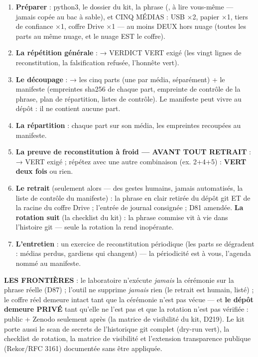 \begin{enumerate}
\item \textbf{Préparer} : python3, le dossier du kit, la phrase
(, à lire vous-même — jamais copée au bac
à sable), et CINQ MÉDIAS : USB ×2, papier ×1, tiers de confiance ×1,
coffre Drive ×1 — au moins DEUX hors nuage (toutes les parts au même
nuage, et le nuage EST le coffre).
\item \textbf{La répétition générale} :  → VERDICT VERT
exigé (les vingt lignes de reconstitution, la falsification refusée,
l'honnête vert).
\item \textbf{Le découpage} :  → les
cinq parts (une par média, séparément) + le manifeste (empreintes sha256
de chaque part, empreinte de contrôle de la phrase, plan de répartition,
listes de contrôle). Le manifeste peut vivre au dépôt : il ne contient
aucune part.
\item \textbf{La répartition} : chaque part sur son média, les empreintes
recoupées au manifeste.
\item \textbf{La preuve de reconstitution à froid — AVANT TOUT RETRAIT} :
 → VERT exigé ; répétez
avec une autre combinaison (ex. 2+4+5) : \textbf{VERT deux fois} ou rien.
\item \textbf{Le retrait} (seulement alors — des gestes humains, jamais
automatisés, la liste de contrôle du manifeste) : la phrase en clair
retirée du dépôt git ET de la racine du coffre Drive ; l'entrée de journal
consignée ; D81 amendée. \textbf{La rotation suit} (la checklist du kit) :
la phrase commise vit à vie dans l'histoire git — seule la rotation la
rend inopérante.
\item \textbf{L'entretien} : un exercice de reconstitution périodique (les
parts se dégradent : médias perdus, gardiens qui changent) — la périodicité
est à vous, l'agenda nommé au manifeste.
\end{enumerate}

\textbf{LES FRONTIÈRES} : le laboratoire n'exécute \emph{jamais} la
cérémonie sur la phrase réelle (D87) ; l'outil ne supprime \emph{jamais}
rien (le retrait est humain, listé) ; le coffre réel demeure intact tant
que la cérémonie n'est pas vécue — et \textbf{le dépôt demeure PRIVÉ}
tant qu'elle ne l'est pas et que la rotation n'est pas vérifiée : public +
Zenodo seulement après (la matrice de visibilité du kit, D219). Le kit
porte aussi le scan de secrets de l'historique git complet (dry-run vert),
la checklist de rotation, la matrice de visibilité et l'extension
transparence publique (Rekor/RFC 3161) documentée sans être appliquée.

